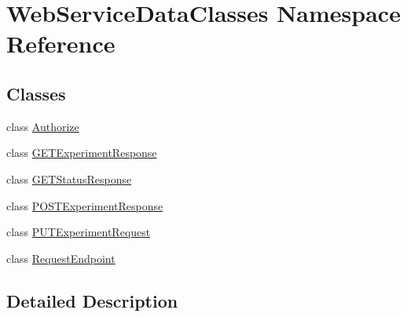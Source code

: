 \hypertarget{namespace_web_service_data_classes}{}\section{Web\+Service\+Data\+Classes Namespace Reference}
\label{namespace_web_service_data_classes}
\subsection*{Classes}
\begin{DoxyCompactItemize}
\item 
class \hyperlink{class_web_service_data_classes_1_1_authorize}{Authorize}
\item 
class \hyperlink{class_web_service_data_classes_1_1_g_e_t_experiment_response}{G\+E\+T\+Experiment\+Response}
\item 
class \hyperlink{class_web_service_data_classes_1_1_g_e_t_status_response}{G\+E\+T\+Status\+Response}
\item 
class \hyperlink{class_web_service_data_classes_1_1_p_o_s_t_experiment_response}{P\+O\+S\+T\+Experiment\+Response}
\item 
class \hyperlink{class_web_service_data_classes_1_1_p_u_t_experiment_request}{P\+U\+T\+Experiment\+Request}
\item 
class \hyperlink{class_web_service_data_classes_1_1_request_endpoint}{Request\+Endpoint}
\end{DoxyCompactItemize}


\subsection{Detailed Description}
